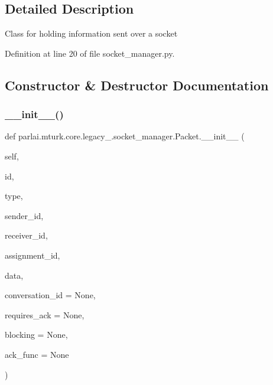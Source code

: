 \subsection{Detailed Description}
\begin{DoxyVerb}Class for holding information sent over a socket\end{DoxyVerb}
 

Definition at line 20 of file socket\+\_\+manager.\+py.



\subsection{Constructor \& Destructor Documentation}
\mbox{\label{classparlai_1_1mturk_1_1core_1_1legacy__2018_1_1socket__manager_1_1Packet_af3a8c6a90bdde11dc1663cd13bf0dca7}} 
\subsubsection{\texorpdfstring{\+\_\+\+\_\+init\+\_\+\+\_\+()}{\_\_init\_\_()}}
{\footnotesize\ttfamily def parlai.\+mturk.\+core.\+legacy\+\_.\+socket\+\_\+manager.\+Packet.\+\_\+\+\_\+init\+\_\+\+\_\+ (\begin{DoxyParamCaption}\item[{}]{self,  }\item[{}]{id,  }\item[{}]{type,  }\item[{}]{sender\+\_\+id,  }\item[{}]{receiver\+\_\+id,  }\item[{}]{assignment\+\_\+id,  }\item[{}]{data,  }\item[{}]{conversation\+\_\+id = {\ttfamily None},  }\item[{}]{requires\+\_\+ack = {\ttfamily None},  }\item[{}]{blocking = {\ttfamily None},  }\item[{}]{ack\+\_\+func = {\ttfamily None} }\end{DoxyParamCaption})}

